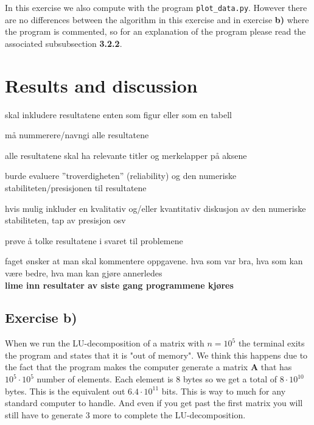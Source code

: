 \documentclass{article}
\begin{document}
    In this exercise we also compute with the program \texttt{plot\_data.py}. However there are no differences between the algorithm in this exercise and in exercise \textbf{b)} where the program is commented, so for an explanation of the program please read the associated subsubsection \textbf{3.2.2}.



\vspace{1cm}

\section{Results and discussion}

  skal inkludere resultatene enten som figur eller som en tabell

  må nummerere/navngi alle resultatene

  alle resultatene skal ha relevante titler og merkelapper på aksene

  burde evaluere ''troverdigheten'' (reliability) og den numeriske stabiliteten/presisjonen til resultatene

  hvis mulig inkluder en kvalitativ og/eller kvantitativ diskusjon av den numeriske stabiliteten, tap av presisjon osv

  prøve å tolke resultatene i svaret til problemene

  faget ønsker at man skal kommentere oppgavene. hva som var bra, hva som kan være bedre, hva man kan gjøre annerledes \\

  {\bf lime inn resultater av siste gang programmene kjøres} \\

  \subsection{Exercise b)}

    When we run the LU-decomposition of a matrix with $n = 10^5$ the terminal exits the program and states that it is "out of memory". We think this happens due to the fact that the program makes the computer generate a matrix \textbf{A} that has $10^5 \cdot 10^5$ number of elements. Each element is 8 bytes so we get a total of $8 \cdot 10^{10}$ bytes. This is the equivalent out $6.4 \cdot 10^{11}$ bits. This is way to much for any standard computer to handle. And even if you get past the first matrix you will still have to generate 3 more to complete the LU-decomposition.
\end{document}
